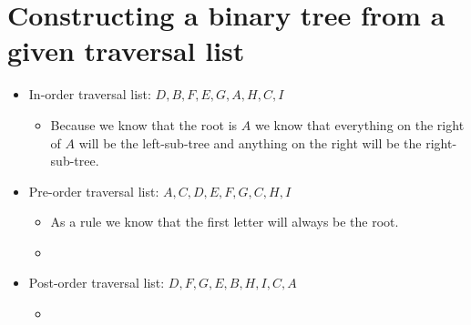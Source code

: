 \section{Constructing a binary tree from a given traversal list}
\begin{itemize}
    \item In-order traversal list: $D,B,F,E,G,A,H,C,I$
        \begin{itemize}
            \item Because we know that the root is $A$ we know that everything on the right of $A$ will be the left-sub-tree and anything on the right will be the right-sub-tree.
        \end{itemize}

    \item Pre-order traversal list: $A,C,D,E,F,G,C,H,I$
        \begin{itemize}
            \item As a rule we know that the first letter will always be the root. 
            \item 
        \end{itemize}
        
    \item Post-order traversal list: $D,F,G,E,B,H,I,C,A$
        \begin{itemize}
            \item 
        \end{itemize}
\end{itemize}

